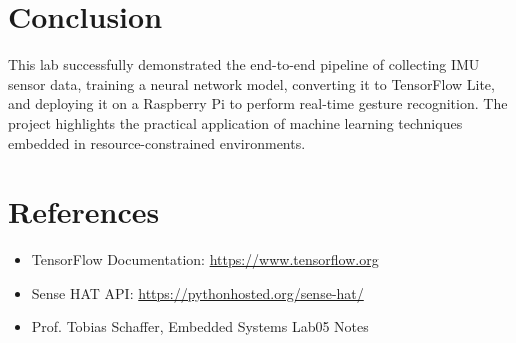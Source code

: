 \documentclass[a4paper,12pt]{article}
\begin{document}
\section{Conclusion}
This lab successfully demonstrated the end-to-end pipeline of collecting IMU sensor data, training a neural network model, converting it to TensorFlow Lite, and deploying it on a Raspberry Pi to perform real-time gesture recognition. The project highlights the practical application of machine learning techniques embedded in resource-constrained environments.

\section{References}
\begin{itemize}
    \item TensorFlow Documentation: \url{https://www.tensorflow.org}
    \item Sense HAT API: \url{https://pythonhosted.org/sense-hat/}
    \item Prof. Tobias Schaffer, Embedded Systems Lab05 Notes
\end{itemize}
\end{document}
